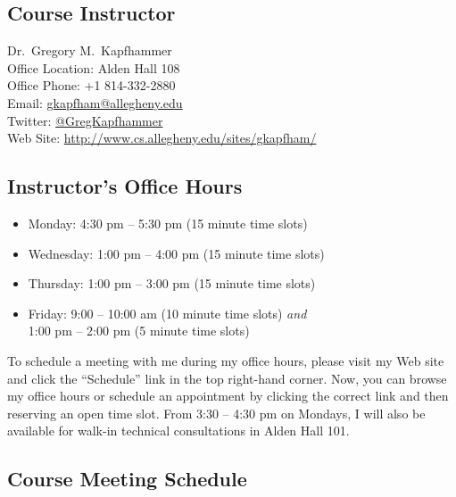 

\usepackage[compact]{titlesec}



\subsection*{Course Instructor}
Dr.\ Gregory M.\ Kapfhammer\\
\noindent Office Location: Alden Hall 108 \\
\noindent Office Phone: +1 814-332-2880 \\
\noindent Email: \url{gkapfham@allegheny.edu} \\
\noindent Twitter: \url{@GregKapfhammer} \\
\noindent Web Site: \url{http://www.cs.allegheny.edu/sites/gkapfham/} 

\subsection*{Instructor's Office Hours}

\begin{itemize}
	\itemsep 0em
	\item Monday: 4:30 pm -- 5:30 pm (15 minute time slots)
	\item Wednesday: 1:00 pm -- 4:00 pm (15 minute time slots)
	\item Thursday: 1:00 pm -- 3:00 pm (15 minute time slots)
	\item Friday: 9:00 -- 10:00 am (10 minute time slots) {\em and} \\ \hspace*{.49in} 1:00 pm -- 2:00 pm (5 minute time slots)
\end{itemize}

\noindent 
To schedule a meeting with me during my office hours, please visit my Web site and click the ``Schedule'' link
in the top right-hand corner. Now, you can browse my office hours or schedule an appointment by clicking the correct
link and then reserving an open time slot. From 3:30 -- 4:30 pm on Mondays, I will also be available for walk-in
technical consultations in Alden Hall 101.  

\subsection*{Course Meeting Schedule}

